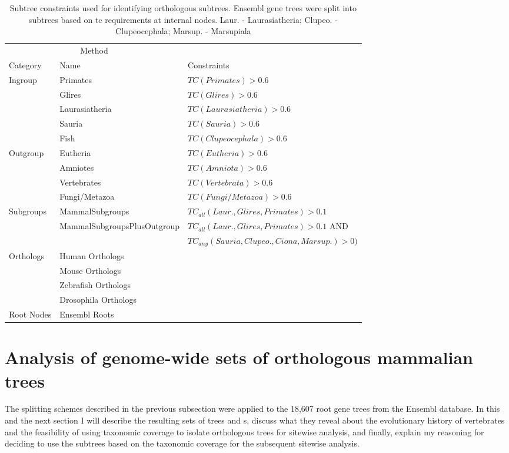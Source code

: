 \begin{table} \footnotesize
\centering
\begin{tabular}{@{}lll@{}} \toprule
\multicolumn{2}{c}{Method} \\ \cmidrule(r){1-2}
   Category & Name & Constraints \\ \midrule
Ingroup & Primates & $TC(Primates) > 0.6$ \\
 &   Glires &  $TC(Glires) > 0.6$ \\
 &   Laurasiatheria & $TC(Laurasiatheria) > 0.6$ \\
 &   Sauria & $TC(Sauria) > 0.6$ \\
 &   Fish & $TC(Clupeocephala) > 0.6$ \\
Outgroup &  Eutheria & $TC(Eutheria) > 0.6$ \\
 &   Amniotes & $TC(Amniota) > 0.6$\\
 &   Vertebrates & $TC(Vertebrata) > 0.6$\\
 &   Fungi/Metazoa & $TC(Fungi/Metazoa) > 0.6$\\
Subgroups &  MammalSubgroups & $TC_{all}(Laur., Glires, Primates) > 0.1$\\
 &   \scriptsize{MammalSubgroupsPlusOutgroup} & $TC_{all}(Laur., Glires, Primates) > 0.1$ AND \\
 &    & $TC_{any}(Sauria, Clupeo., Ciona, Marsup.) > 0)$ \\
Orthologs & Human Orthologs & \\
 &   Mouse Orthologs &  \\
 &   Zebrafish Orthologs &  \\
 &   Drosophila Orthologs &  \\
Root Nodes & Ensembl Roots &  \\
\bottomrule
\end{tabular}
\caption{Subtree constraints used for identifying \euth
  orthologous subtrees. Ensembl gene trees were split into subtrees
  based on \acf{tc} requirements at internal
  nodes. Laur. - Laurasiatheria; Clupeo. - Clupeocephala; Marsup. -
  Marsupiala}
\label{subtree_constraints}
\end{table}

\section{Analysis of genome-wide sets of orthologous mammalian trees}

The \subtr splitting schemes described in the previous subsection were
applied to the 18,607 root gene trees from the Ensembl database. In
this and the next section I will describe the resulting sets of trees
and \subtr{}s, discuss what they reveal about the evolutionary history
of vertebrates and the feasibility of using taxonomic coverage to
isolate orthologous trees for sitewise analysis, and finally, explain
my reasoning for deciding to use the subtrees based on the \euth
taxonomic coverage for the subsequent sitewise analysis.

